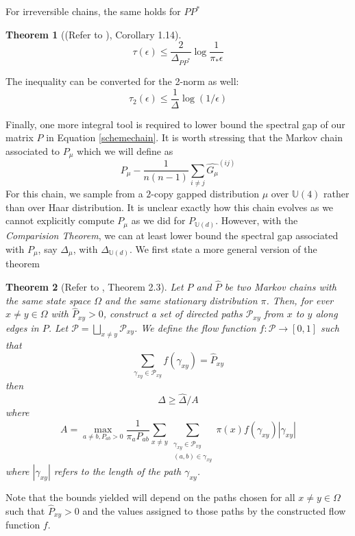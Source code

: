 \documentclass[12pt]{amsart}
\newtheorem{theorem}{Theorem}[section]
\theoremstyle{definition}
\theoremstyle{remark}
\numberwithin{equation}{section}
\theoremstyle{remark}
\begin{document}
\noindent For irreversible chains, the same holds for $PP^*$
%
\begin{theorem}[(Refer to \cite{montenegro}), Corollary 1.14]
  \begin{equation}
    \tau(\epsilon) \leq \frac{2}{\Delta_{PP^*}}\log\frac{1}{\pi_*\epsilon}
  \end{equation}
\end{theorem}
\noindent The inequality can be converted for the 2-norm as well:
%
\begin{equation} \label{2spectralgap}
  \tau_2(\epsilon) \leq \frac{1}{\Delta}\log(1/\epsilon)
\end{equation}

Finally, one more integral tool is required to lower bound the spectral gap of our matrix $P$ in Equation \ref{schemechain}. It is worth stressing that the Markov chain associated to $P_{\mu}$ which we will define as
%
\begin{equation}
P_\mu - \frac{1}{n(n-1)}\sum_{i\neq j}\widehat{G_\mu}^{(ij)}
\end{equation}
For this chain, we sample from a $2$-copy gapped distribution $\mu $ over $\mathbb{U}(4)$ rather than over Haar distribution. It is unclear exactly how this chain evolves as we cannot explicitly compute $P_\mu$ as we did for $P_{\mathbb{U}(d)}$. However, with the \emph{Comparision Theorem}, we can at least lower bound the spectral gap associated with $P_\mu$, say $\Delta_\mu$, with $\Delta_{\mathbb{U}(d)}$. We first state a more general version of the theorem
%
\begin{theorem}[Refer to \cite{montenegro}, Theorem 2.3] \label{comptheorem}
  Let $P$ and $\widehat{P}$ be two Markov chains with the same state space $\Omega$ and the same stationary distribution $\pi$. Then, for ever $x \neq y \in \Omega$ with $\widehat{P}_{xy} > 0$, construct a set of directed paths $\mathcal{P}_{xy}$ from $x$ to $y$ along edges in $P$. Let $\mathcal{P} = \bigsqcup_{x\neq y} \mathcal{P}_{xy}$. We define the flow function $f: \mathcal{P} \rightarrow [0,1]$ such that
  \begin{equation}
    \sum_{\gamma_{xy} \in \mathcal{P}_{xy}} f(\gamma_{xy}) = \widehat{P}_{xy}
  \end{equation}
  then
  $$ \Delta \geq \widehat{\Delta}/A $$
  where
  $$ A = \max_{a \neq b, P_{ab} > 0}\frac{1}{\pi_aP_{ab}} \sum_{x \neq y}\sum_{
                          \substack {
                          \gamma_{xy} \in \mathcal{P}_{xy} \\
                          (a,b) \in \gamma_{xy}}}  \pi(x)f(\gamma_{xy})|\gamma_{xy}|$$
  where $|\gamma_{xy}|$ refers to the length of the path $\gamma_{xy}$.
\end{theorem}
\noindent Note that the bounds yielded will depend on the paths chosen for all $x \neq y \in \Omega$ such that $\widehat{P}_{xy} > 0$ and the values assigned to those paths by the constructed flow function $f$.
\newline
\end{document}
